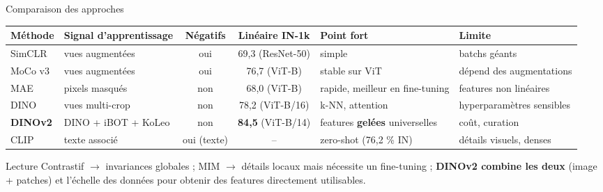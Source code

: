 \documentclass[aspectratio=169,10pt]{beamer}
\newcommand{\src}[1]{\par\vfill\hfill{\tiny\color{grisE}#1}}
\begin{document}
\begin{frame}{Comparaison des approches}
  \scriptsize
  \begin{tabularx}{\linewidth}{@{}l l c c L L@{}}
    \toprule
    \textbf{Méthode} & \textbf{Signal d'apprentissage} & \textbf{Négatifs} & \textbf{Linéaire IN-1k} & \textbf{Point fort} & \textbf{Limite}\\
    \midrule
    SimCLR & vues augmentées & oui & 69,3 (ResNet-50) & simple & batchs géants\\
    MoCo v3 & vues augmentées & oui & 76,7 (ViT-B) & stable sur ViT & dépend des augmentations\\
    MAE & pixels masqués & non & 68,0 (ViT-B) & rapide, meilleur en fine-tuning & features non linéaires\\
    DINO & vues multi-crop & non & 78,2 (ViT-B/16) & k-NN, attention & hyperparamètres sensibles\\
    \textbf{DINOv2} & DINO + iBOT + KoLeo & non & \textbf{84,5} (ViT-B/14) & features \textbf{gelées} universelles & coût, curation\\
    CLIP & texte associé & oui (texte) & -- & zero-shot (76,2 \% IN) & détails visuels, denses\\
    \bottomrule
  \end{tabularx}
  \vspace{3mm}
  \begin{block}{Lecture}
    \footnotesize Contrastif $\to$ invariances globales ; MIM $\to$ détails locaux mais nécessite un fine-tuning ; \textbf{DINOv2 combine les deux} (image + patches) et l'échelle des données pour obtenir des features directement utilisables.
  \end{block}
  \src{\citet{chen2020simclr,chen2021mocov3,he2022mae,caron2021dino,oquab2024dinov2,radford2021clip}}
\end{frame}
\end{document}
